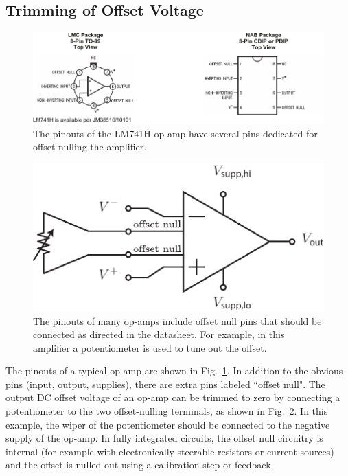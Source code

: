 \subsection{Trimming of Offset Voltage}
\begin{figure}[tb]
\begin{center}
\includegraphics[width=1\columnwidth]{lm741_pinout}
\end{center}
\caption{The pinouts of the LM741H op-amp have several pins dedicated for offset nulling the amplifier.} \label{fig:lm741_pinout}
\end{figure}
\begin{figure}[tb]
\begin{center}
\includegraphics[scale=1]{opamp_pinout_offset}
\end{center}
\caption{The pinouts of many op-amps include offset null pins that should be connected as directed in the datasheet.  For example, in this amplifier a potentiometer is used to tune out the offset.} \label{fig:opamp_pinout_offset}
\end{figure}

The pinouts of a typical op-amp are shown in Fig.~\ref{fig:lm741_pinout}.  In addition to the obvious pins (input, output, supplies), there are extra pins labeled ``offset null".   The output DC offset voltage of an op-amp can be trimmed to zero by connecting a potentiometer to the two offset-nulling terminals, as shown in Fig.~\ref{fig:opamp_pinout_offset}. In this example, the wiper of the potentiometer should be connected to the negative supply of the op-amp.  In fully integrated circuits, the offset null circuitry is internal (for example with electronically steerable resistors or current sources) and the offset is nulled out using a calibration step or feedback.  
